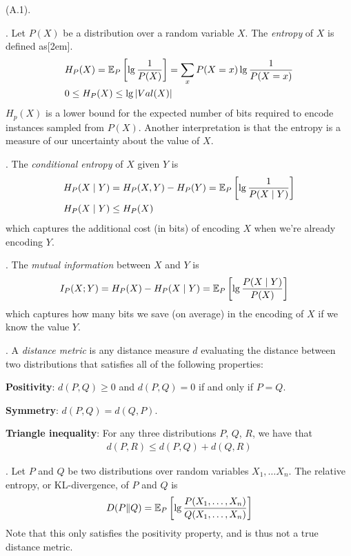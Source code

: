 \documentclass[11pt]{article}
\begin{document}
\p {} (A.1). 
\begin{compactitem}
	\item {}. Let $P(X)$ be a distribution over a random variable $X$. The \textit{entropy} of $X$ is defined as[2em]. 
	\begin{align}
		&H_P(X) = \E[P]{\lg \inv{P(X)}} = \sum_x P(X = x) \lg \inv{P(X = x)} \\
		&0 \le H_P(X) \le \lg|Val(X)|
	\end{align}
	$H_p(X)$ is a lower bound for the expected number of bits required to encode instances sampled from $P(X)$. Another interpretation is that the entropy is a measure of our uncertainty about the value of $X$. 
	
	\item {}. The \textit{conditional entropy} of $X$ given $Y$ is 
	\begin{align}
		H_P(X \mid Y) &= H_P(X, Y) - H_P(Y) = \E[P]{\lg \inv{P(X \mid Y)}} \\
		H_P(X \mid Y) &\le H_P(X)
	\end{align}
	which captures the additional cost (in bits) of encoding $X$ when we're already encoding $Y$. 
	
	\item {}. The \textit{mutual information} between $X$ and $Y$ is 
	\begin{align}
		I_P(X; Y) &= H_P(X) - H_P(X \mid Y) = \E[P]{\lg \frac{P(X\mid Y)}{ P(X) } }
	\end{align}
	which captures how many bits we save (on average) in the encoding of $X$ if we know the value $Y$. 
	
	\item {}. A \textit{distance metric} is any distance measure $d$ evaluating the distance between two distributions that satisfies all of the following properties:
	\begin{compactitem}
		\item \textbf{Positivity}: $d(P, Q) \ge 0$ and $d(P, Q) = 0$ if and only if $P = Q$. 
		\item \textbf{Symmetry}: $d(P, Q) = d(Q, P)$. 
		\item \textbf{Triangle inequality}: For any three distributions $P$, $Q$, $R$, we have that
		\begin{align}
			d(P, R) \le d(P, Q) + d(Q, R)
		\end{align}
	\end{compactitem}
	
	\item {}. Let $P$ and $Q$ be two distributions over random variables $X_1, \ldots X_n$. The relative entropy, or KL-divergence, of $P$ and $Q$ is 
	\begin{align}
		D(P \| Q) = \E[P]{\lg \frac{ P(X_1, \ldots, X_n ) }{ Q(X_1, \ldots, X_n) }  }
	\end{align}
	Note that this only satisfies the positivity property, and is thus not a true distance metric. 
\end{compactitem}
\end{document}
